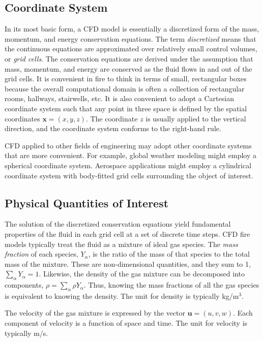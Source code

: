 \documentclass[graybox]{svmult}
\begin{document}
\subsection{Coordinate System}

In its most basic form, a CFD model is essentially a discretized form of the mass, momentum, and energy conservation equations. The term {\em discretized} means that the continuous equations are approximated over relatively small control volumes, or {\em grid cells}. The conservation equations are derived under the assumption that mass, momentum, and energy are conserved as the fluid flows in and out of the grid cells. It is convenient in fire to think in terms of small, rectangular boxes because the overall computational domain is often a collection of rectangular rooms, hallways, stairwells, etc. It is also convenient to adopt a Cartesian coordinate system such that any point in three space is defined by the spatial coordinates $\mathbf{x}=(x,y,z)$. The coordinate $z$ is usually applied to the vertical direction, and the coordinate system conforms to the right-hand rule.

CFD applied to other fields of engineering may adopt other coordinate systems that are more convenient. For example, global weather modeling might employ a spherical coordinate system. Aerospace applications might employ a cylindrical coordinate system with body-fitted grid cells surrounding the object of interest.


\subsection{Physical Quantities of Interest}

The solution of the discretized conservation equations yield fundamental properties of the fluid in each grid cell at a set of discrete time steps. CFD fire models typically treat the fluid as a mixture of ideal gas species. The {\em mass fraction} of each species, $Y_\alpha$, is the ratio of the mass of that species to the total mass of the mixture. These are non-dimensional quantities, and they sum to 1, $\sum_\alpha Y_\alpha = 1$. Likewise, the density of the gas mixture can be decomposed into components, $\rho = \sum_\alpha \rho Y_\alpha$. Thus, knowing the mass fractions of all the gas species is equivalent to knowing the density. The unit for density is typically kg/m$^3$.

The velocity of the gas mixture is expressed by the vector $\mathbf{u}=(u,v,w)$. Each component of velocity is a function of space and time. The unit for velocity is typically m/s.
\end{document}

